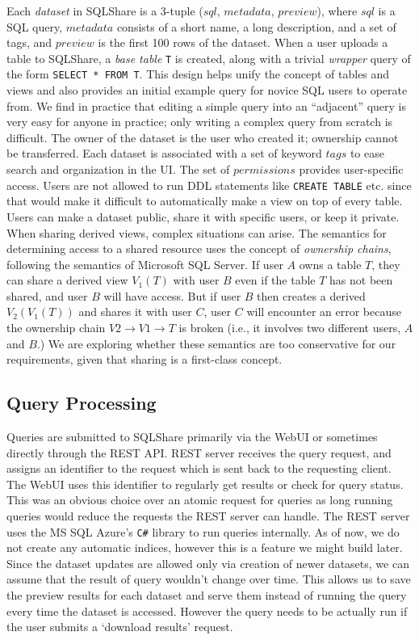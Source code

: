 \documentclass{sig-alternate}
\newcommand{\note}[2]{{\color{#1} {#2}}}
\newcommand{\reviewone}[1]{\note{black}{#1}}
\newcommand{\sqlshare}{SQLShare}
\begin{document}
Each \emph{dataset} in \sqlshare{} is a 3-tuple ($sql$, $metadata$, $preview$), where $sql$ is a SQL query, $metadata$ consists of a short name, a long description, and a set of tags, and $preview$ is the first 100 rows of the dataset.
When a user uploads a table to \sqlshare{}, a \emph{base table} \texttt{T} is created, along with a trivial \emph{wrapper} query of the form \texttt{SELECT * FROM T}.  This design helps unify the concept of tables and views and also provides an initial example query for novice SQL users to operate from. We find in practice that editing a simple query into an ``adjacent'' query is very easy for anyone in practice; only writing a complex query from scratch is difficult.
The owner of the dataset is the user who created it; ownership cannot be transferred. Each dataset is associated with a set of keyword $tags$ to ease search and organization in the UI. The set of $permissions$ provides user-specific access. Users are not allowed to run DDL statements like \texttt{CREATE TABLE} etc. since that would make it difficult to automatically make a view on top of every table. \reviewone{Users can make a dataset public, share it with specific users, or keep it private. When sharing derived views, complex situations can arise.  The semantics for determining access to a shared resource uses the concept of \emph{ownership chains}, following the semantics of Microsoft SQL Server.  If user $A$ owns a table $T$, they can share a derived view $V_1(T)$ with user $B$ even if the table $T$ has not been shared, and user $B$ will have access.  But if user $B$ then creates a derived $V_2(V_1(T))$ and shares it with user $C$, user $C$ will encounter an error because the ownership chain $V2\rightarrow V1 \rightarrow T$ is broken (i.e., it involves two different users, $A$ and $B$.)  We are exploring whether these semantics are too conservative for our requirements, given that sharing is a first-class concept.}

\subsection{Query Processing}
Queries are submitted to \sqlshare{} primarily via the WebUI or sometimes directly through the REST API. REST server receives the query request, and assigns an identifier to the request which is sent back to the requesting client. The WebUI uses this identifier to regularly get results or check for query status. 
This was an obvious choice over an atomic request for queries as long running queries would reduce the requests the REST server can handle.
The REST server uses the MS SQL Azure's \texttt{C\#} library to run queries internally. As of now, we do not create any automatic indices, however this is a feature we might build later.
Since the dataset updates are allowed only via creation of newer datasets, we can assume that the result of query wouldn't change over time. 
This allows us to save the preview results for each dataset and serve them instead of running the query every time the dataset is accessed. However the query needs to be actually run if the user submits a `download results' request. 
\end{document}
